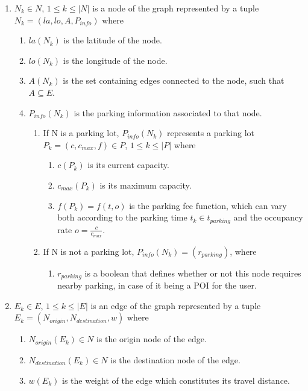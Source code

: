 \documentclass[a4paper, 12pt]{report}
\begin{document}
\begin{enumerate}
        \item $N_{k} \in N$, $1 \leqslant k \leqslant |N|$ is a node of the graph represented by a tuple $N_k = (la, lo, A, P_{info})$ where
        \begin{enumerate}
            \item $la(N_k)$ is the latitude of the node.
            \item $lo(N_k)$ is the longitude of the node. 
            \item $A(N_k)$ is the set containing edges connected to the node, such that $A \subseteq E$.
            \item $P_{info}(N_k)$ is the parking information associated to that node.
            \begin{enumerate}
                \item If N is a parking lot, $P_{info}(N_k)$ represents a parking lot $P_k = (c,c_{max},f) \in P$, $1 \leqslant k \leqslant |P|$  where
                \begin{enumerate}
                    \item $c(P_k)$ is its current capacity.
                    \item $c_{max}(P_k)$ is its maximum capacity.
                    \item $f(P_k) = f(t,o)$ is the parking fee function, which can vary both according to the parking time $t_k \in t_{parking}$ and the occupancy rate $o = \frac{c}{c_{max}}$.
                \end{enumerate}
                \item If N is not a parking lot, $P_{info}(N_k) = (r_{parking})$, where
                \begin{enumerate}
                    \item $r_{parking}$ is a boolean that defines whether or not this node requires nearby parking, in case of it being a POI for the user.
                \end{enumerate}
            \end{enumerate}
        \end{enumerate}
        
        \item $E_{k} \in E$, $1 \leqslant k \leqslant |E|$ is an edge of the graph represented by a tuple $E_k = (N_{origin}, N_{destination}, w)$ where
        \begin{enumerate}
            \item $N_{origin}(E_k) \in N$ is the origin node of the edge.
            \item $N_{destination}(E_k) \in N$ is the destination node of the edge.
            \item $w(E_k)$ is the weight of the edge which constitutes its travel distance.
        \end{enumerate}
    

\end{enumerate}
\end{document}
